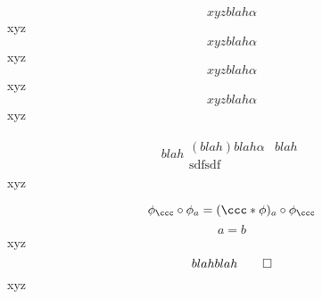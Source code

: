 {
\begin{equation} xyz
	blah \alpha
\end{equation} xyz
\begin{equation} xyz	blah \alpha\end{equation} xyz 
\begin{equation} xyz	blah \alpha\end{equation} xyz \begin{equation} xyz	blah \alpha\end{equation} xyz 

\begin{eqnarray} blah
	\begin{split}
(blah) blah \alpha & blah \\
\text{sdfsdf}	
	\end{split}
\end{eqnarray} xyz 
}

{
$$\phi_\ccc\circ\phi_a=(\ccc*\phi)_a\circ\phi_\ccc$$ 
\begin{equation} a=b\nonumber\end{equation}
xyz 
\[blah blah \qedhere\] xyz
}


